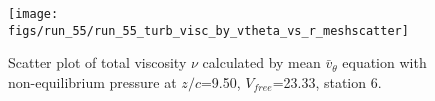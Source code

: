 \begin{figure}[H]
\centering
\texttt{[image: figs/run\_55/run\_55\_turb\_visc\_by\_vtheta\_vs\_r\_meshscatter]}
\caption{Scatter plot of total viscosity $\nu$ calculated by mean $\bar{v}_{\theta}$ equation with non-equilibrium pressure at $z/c$=9.50, $V_{free}$=23.33, station 6.}
\label{fig:run_55_turb_visc_by_vtheta_vs_r_meshscatter}
\end{figure}


